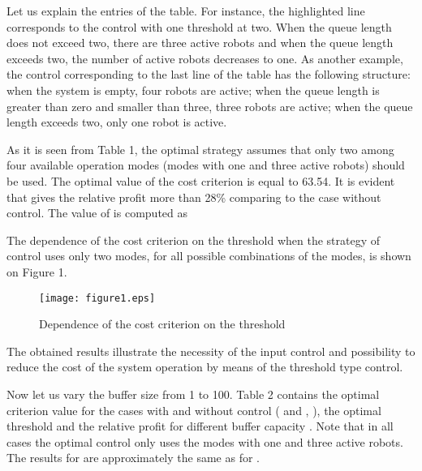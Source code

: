 \documentclass[11pt]{article}
\begin{document}
Let us explain the entries of the table. For instance, the
highlighted line corresponds to the control with one threshold at
two. When the queue length does not exceed two, there are three
active robots and when the queue length exceeds two, the number of
active robots decreases to one. As another example, the control
corresponding to the last line of the table has the following
structure: when the system is empty, four robots are active; when
the queue length is greater than zero and smaller than three, three
robots are active; when the queue length exceeds two, only one robot
is active.

As it is seen from Table 1, the optimal strategy assumes that only
 two among four available operation
modes (modes with one and three active robots) should be used. The
optimal value  of the cost criterion is equal to 63.54. It is
evident that  gives the relative profit  more than 28\%
comparing to the case without control. The value of  is computed
as


The dependence of the cost criterion on the threshold when the
strategy of control  uses only two modes, for all possible
combinations of the modes, is shown on Figure 1.

\begin{figure}[htb]
\centering \texttt{[image: figure1.eps]}\\
  \caption{Dependence of the cost criterion on the threshold}
\end{figure}


The obtained results illustrate the necessity of the input control
and possibility to reduce the cost of the system operation by means
of the threshold type control.

Now let  us vary the buffer size   from 1 to 100. Table 2
contains the optimal criterion value for the cases with and without
control ( and , ), the optimal threshold
 and the relative profit  for different buffer capacity .
Note that in all cases the optimal control only uses the modes with
one and three active robots. The results for  are
approximately the same as for .
\end{document}
